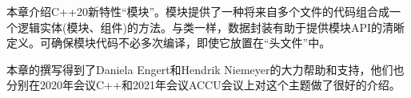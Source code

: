 本章介绍C++20新特性“模块”。模块提供了一种将来自多个文件的代码组合成一个逻辑实体(模块、组件)的方法。与类一样，数据封装有助于提供模块API的清晰定义。可确保模块代码不必多次编译，即使它放置在“头文件”中。

本章的撰写得到了Daniela Engert和Hendrik Niemeyer的大力帮助和支持，他们也分别在2020年会议C++和2021年会议ACCU会议上对这个主题做了很好的介绍。